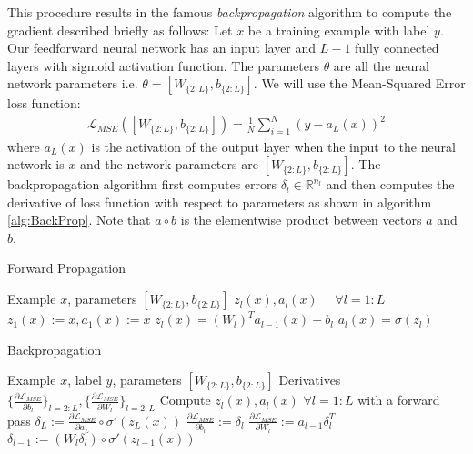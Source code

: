 This procedure results in the famous \textit{backpropagation} algorithm to compute the gradient described briefly as follows:
Let $x$ be a training example with label $y$. Our feedforward neural network has an input layer and $L-1$ fully connected layers with sigmoid activation function. The parameters $\theta$ are all the neural network parameters i.e. $\theta = [W_{\{2:L\}}, b_{\{2:L\}}]$. We will use the Mean-Squared Error loss function:
\begin{align}
\mathcal{L}_{MSE} ([W_{\{2:L\}}, b_{\{2:L\}}]) = \frac{1}{N} \sum_{i=1}^N ( y - a_L(x))^2
\end{align}
where $a_L(x)$ is the activation of the output layer when the input to the neural network is $x$ and the network parameters are $[W_{\{2:L\}}, b_{\{2:L\}}]$.
The backpropagation algorithm first computes errors $\delta_l \in \mathbb{R}^{n_l}$ and then computes the derivative of loss function with respect to parameters as shown in algorithm \ref{alg:BackProp}. Note that $a \circ b$ is the elementwise product between vectors $a$ and $b$.
\begin{algorithm}[tb]
   \caption{Forward Propagation}
   \label{alg:FwdPass}
\begin{algorithmic}
    Example $x$, parameters $[W_{\{2:L\}}, b_{\{2:L\}}]$
    $z_l(x), a_l(x) \hspace{16pt} \forall l=1:L$
   \STATE
   \STATE $z_1(x) := x, a_1(x) := x$
   \STATE $z_l(x) = (W_l)^T a_{l-1}(x) + b_l$
   \STATE $a_l(x) = \sigma(z_l)$
   \ENDFOR
\end{algorithmic}
\end{algorithm}
\begin{algorithm}[tb]
   \caption{Backpropagation}
   \label{alg:BackProp}
\begin{algorithmic}
    Example $x$, label $y$, parameters $[W_{\{2:L\}}, b_{\{2:L\}}]$
    Derivatives $\{\frac{\partial \mathcal{L}_{MSE}}{\partial b_l}\}_{l=2:L}, \{\frac{\partial \mathcal{L}_{MSE}}{\partial W_l}\}_{l=2:L}$
   \STATE
   \STATE Compute $z_l(x), a_l(x) \hspace{4pt} \forall l=1:L$ with a forward pass
   \STATE $\delta_L := \frac{\partial \mathcal{L}_{MSE}}{\partial a_L} \circ \sigma'(z_L(x))$
   \STATE $\frac{\partial \mathcal{L}_{MSE}}{\partial b_l} := \delta_l$
   \STATE $\frac{\partial \mathcal{L}_{MSE}}{\partial W_l} := a_{l-1} \delta_l^T$
   \STATE $\delta_{l-1} := (W_l \delta_l) \circ \sigma'(z_{l-1}(x))$
   \ENDFOR
\end{algorithmic}
\end{algorithm}